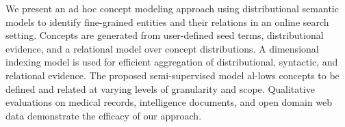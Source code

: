 We present an ad hoc concept modeling approach using distributional semantic models to identify fine-grained entities and their relations in an online search setting. Concepts are generated from user-defined seed terms, distributional evidence, and a relational model over concept distributions. A dimensional indexing model is used for efficient aggregation of distributional, syntactic, and relational evidence. The proposed semi-supervised model al-lows concepts to be defined and related at varying levels of granularity and scope. Qualitative evaluations on medical records, intelligence documents, and open domain web data demonstrate the efficacy of our approach.
